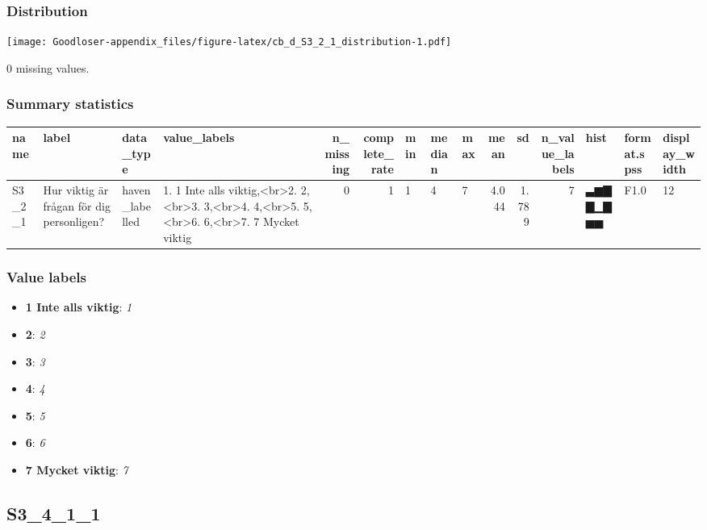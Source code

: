\documentclass[
]{book}
\providecommand{\tightlist}{%
  \setlength{\itemsep}{0pt}\setlength{\parskip}{0pt}}
\begin{document}
\hypertarget{S3_2_1_distribution}{%
\subsubsection{Distribution}\label{S3_2_1_distribution}}

\texttt{[image: Goodloser-appendix\_files/figure-latex/cb\_d\_S3\_2\_1\_distribution-1.pdf]}

0 missing values.

\hypertarget{S3_2_1_summary}{%
\subsubsection{Summary statistics}\label{S3_2_1_summary}}

\begin{tabular}{l|l|l|l|r|r|l|l|l|r|r|r|l|l|l}
\hline
name & label & data_type & value_labels & n_missing & complete_rate & min & median & max & mean & sd & n_value_labels & hist & format.spss & display_width\\
\hline
S3_2_1 & Hur viktig är frågan för dig personligen? & haven_labelled & 1. 1 Inte alls viktig,<br>2. 2,<br>3. 3,<br>4. 4,<br>5. 5,<br>6. 6,<br>7. 7 Mycket viktig & 0 & 1 & 1 & 4 & 7 & 4.044 & 1.789 & 7 & ▃▆▇▇▁▇▅▅ & F1.0 & 12\\
\hline
\end{tabular}

\hypertarget{S3_2_1_labels}{%
\subsubsection{Value labels}\label{S3_2_1_labels}}

\begin{itemize}
\tightlist
\item
  \textbf{1 Inte alls viktig}: \emph{1}
\item
  \textbf{2}: \emph{2}
\item
  \textbf{3}: \emph{3}
\item
  \textbf{4}: \emph{4}
\item
  \textbf{5}: \emph{5}
\item
  \textbf{6}: \emph{6}
\item
  \textbf{7 Mycket viktig}: \emph{7}
\end{itemize}

\hypertarget{S3_4_1_1}{%
\subsection{S3\_4\_1\_1}\label{S3_4_1_1}}
\end{document}
